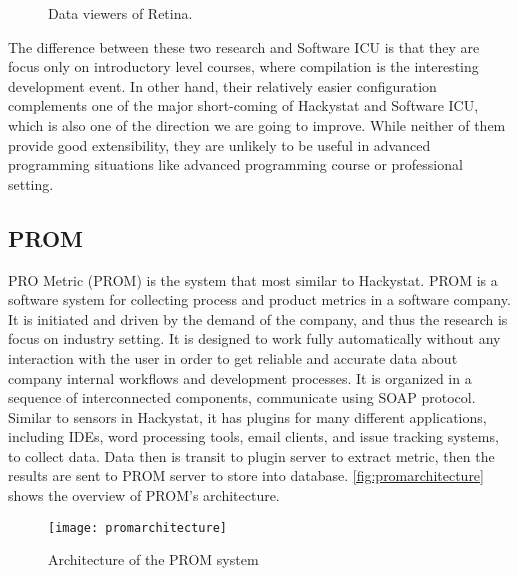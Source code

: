 \begin{figure}[htbp]
     \centering
          
     \caption{Data viewers of Retina.}
     \label{fig:retina}
\end{figure}

The difference between these two research and Software ICU is that they are focus only on introductory level courses, where compilation is the interesting development event. In other hand, their relatively easier configuration complements one of the major short-coming of Hackystat and Software ICU, which is also one of the direction we are going to improve. While neither of them provide good extensibility, they are unlikely to be useful in advanced programming situations like advanced programming course or professional setting.

\subsection {PROM}
PRO Metric (PROM) \cite{prom03} is the system that most similar to Hackystat. PROM is a software system for collecting process and product metrics in a software company. It is initiated and driven by the demand of the company, and thus the research is focus on industry setting. It is designed to work fully automatically without any interaction with the user in order to get reliable and accurate data about company internal workflows and development processes. It is organized in a sequence of interconnected components, communicate using SOAP protocol. Similar to sensors in Hackystat, it has plugins for many different applications, including IDEs, word processing tools, email clients, and issue tracking systems, to collect data. Data then is transit to plugin server to extract metric, then the results are sent to PROM server to store into database. \autoref{fig:promarchitecture} shows the overview of PROM's architecture.

\begin{figure}[htbp]
     \centering
     \texttt{[image: promarchitecture]}
     \caption{Architecture of the PROM system}
     \label{fig:promarchitecture}
\end{figure}

